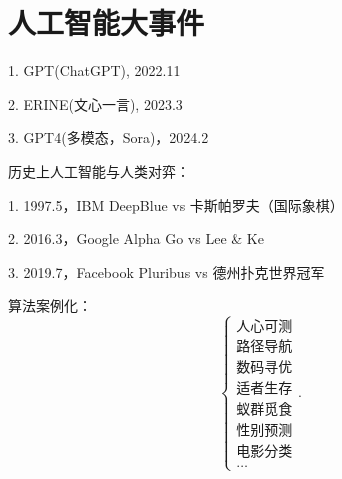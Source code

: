 \def\lecturer{熊庆宇}
\def\noter{THF}
\def\className{Artificial Intelligence Outline}
\def\term{III-B}



\maketitle
\tableofcontents
\section{人工智能大事件}%
\label{sec:人工智能大事件}
1. GPT(ChatGPT), 2022.11

2. ERINE(文心一言), 2023.3

3. GPT4(多模态，Sora)，2024.2
\begin{notation}
    历史上人工智能与人类对弈：

    1. 1997.5，IBM DeepBlue vs 卡斯帕罗夫（国际象棋）

    2. 2016.3，Google Alpha Go vs Lee \& Ke

    3. 2019.7，Facebook Pluribus vs 德州扑克世界冠军
\end{notation}
算法案例化：
\[
    \begin{cases}
        \mbox{人心可测}\\ 
        \mbox{路径导航}\\ 
        \mbox{数码寻优}\\ 
        \mbox{适者生存}\\ 
        \mbox{蚁群觅食}\\ 
        \mbox{性别预测}\\ 
        \mbox{电影分类}\\ 
        \ldots
    \end{cases}
.\] 

































